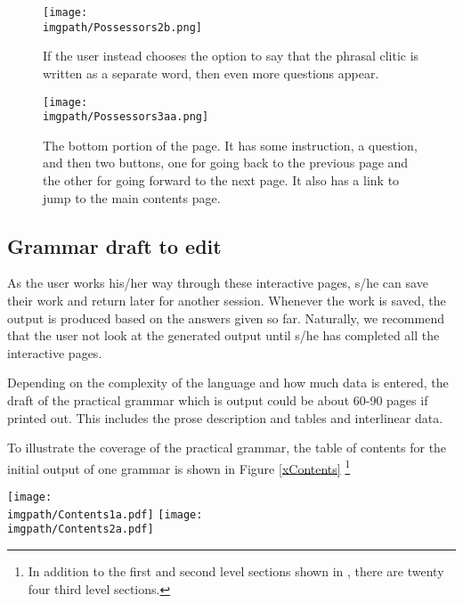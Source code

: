 \clearpage
\begin{figure}[p]
\texttt{[image: \\imgpath/Possessors2b.png]}
\label{xPossessors2b}%
 \caption{If the user instead chooses the option to say that the phrasal clitic is written as a separate word, then even more questions appear.}
\end{figure} 

\clearpage
\begin{figure}[p]
\texttt{[image: \\imgpath/Possessors3aa.png]}
\caption{The bottom portion of the page. It has some instruction, a question, and then two buttons, one for going back to the previous page and the other for going forward to the next page. It also has a link to jump to the main contents page.}
 \label{xPossessors3}%
\end{figure} 
 \clearpage

\subsection{Grammar draft to edit}\label{sGrammar}
As the user works his/her way through these interactive pages, s/he can save their work and return later for another session. Whenever the work is saved, the output is produced based on the answers given so far. Naturally, we recommend that the user not look at the generated output until s/he has completed all the interactive pages.

Depending on the complexity of the language and how much data is entered, the draft of the practical grammar which is output could be about 60-90 pages if printed out. This includes the prose description and tables and interlinear data.

To illustrate the coverage of the practical grammar, the table of contents for the initial output of one grammar is shown in Figure \ref{xContents} \footnote{\label{nThirdLevelSections}
   In addition to the first and second level sections shown in , there are twenty four third level sections.
}

\begin{sidewaysfigure}
\texttt{[image: \\imgpath/Contents1a.pdf]}
\texttt{[image: \\imgpath/Contents2a.pdf]}
\caption{Table of contents for the initial output of one grammar}
\label{xContents}%
\end{sidewaysfigure}


